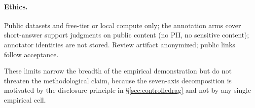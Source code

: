 \paragraph{Ethics.} Public datasets and free-tier or local compute
only; the annotation arms cover short-answer support judgments on
public content (no PII, no sensitive content); annotator identities
are not stored. Review artifact anonymized; public links follow
acceptance.

\noindent These limits narrow the breadth of the empirical
demonstration but do not threaten the methodological claim, because
the seven-axis decomposition is motivated by the disclosure
principle in \S\ref{sec:controlledrag} and not by any single
empirical cell.

